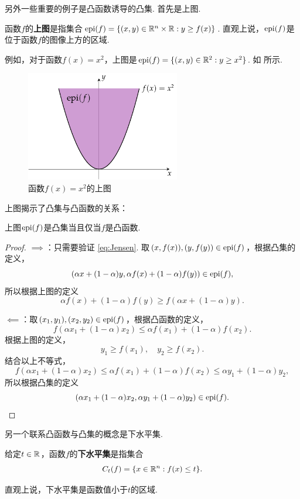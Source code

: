 另外一些重要的例子是凸函数诱导的凸集. 首先是上图. 

\begin{definition}[上图]
    函数$f$的\textbf{上图}是指集合$\operatorname*{epi}(f)=\{(x,y)\in\mathbb{R}^{n}\times\mathbb{R}:y\geq f(x)\}$. 直观上说，$\operatorname*{epi}(f)$是位于函数$f$的图像上方的区域.
\end{definition}

例如，对于函数$f(x)=x^2$，上图是$\operatorname*{epi}(f)=\{(x,y)\in\mathbb{R}^2:y\geq x^2\}$. 如 所示.

\begin{figure}[ht]
    \centering
    \includegraphics[width=0.6\textwidth]{figures/convex-anlaysis/epigraph.pdf}
    \caption{函数$f(x)=x^2$的上图}
    \label{fig:epigraph}
\end{figure}

上图揭示了凸集与凸函数的关系：
\begin{theorem}\label{thm:convex-epi}
    上图$\operatorname*{epi}(f)$是凸集当且仅当$f$是凸函数.
\end{theorem}

\begin{proof}
$\implies$：只需要验证 \eqref{eq:Jensen}. 取$(x,f(x)),(y,f(y))\in\operatorname*{epi}(f)$，根据凸集的定义，
\[(\alpha x+(1-\alpha)y,\alpha f(x)+(1-\alpha)f(y))\in\operatorname*{epi}(f),\]
所以根据上图的定义
\[\alpha f(x)+(1-\alpha)f(y)\geq f(\alpha x+(1-\alpha)y).\]

$\impliedby$：取$(x_1,y_1),(x_2,y_2)\in\operatorname*{epi}(f)$，根据凸函数的定义，
\[f(\alpha x_1+(1-\alpha) x_2)\leq\alpha f(x_1)+(1-\alpha)f(x_2).\]
根据上图的定义，
\[y_1\geq f(x_1),\quad y_2\geq f(x_2).\]
结合以上不等式，
\[f(\alpha x_1+(1-\alpha) x_2)\leq\alpha f(x_1)+(1-\alpha)f(x_2)\leq\alpha y_1+(1-\alpha) y_2,\]
所以根据凸集的定义
\[(\alpha x_1+(1-\alpha) x_2,\alpha y_1+(1-\alpha) y_2)\in\operatorname*{epi}(f).\]
\end{proof}

另一个联系凸函数与凸集的概念是下水平集. 
\begin{definition}[下水平集]
    给定$t\in\mathbb{R}$，函数$f$的\textbf{下水平集}是指集合
    \[C_t(f)=\{x\in\mathbb{R}^n:f(x)\leq t\}.\]
\end{definition}
直观上说，下水平集是函数值小于$t$的区域.

